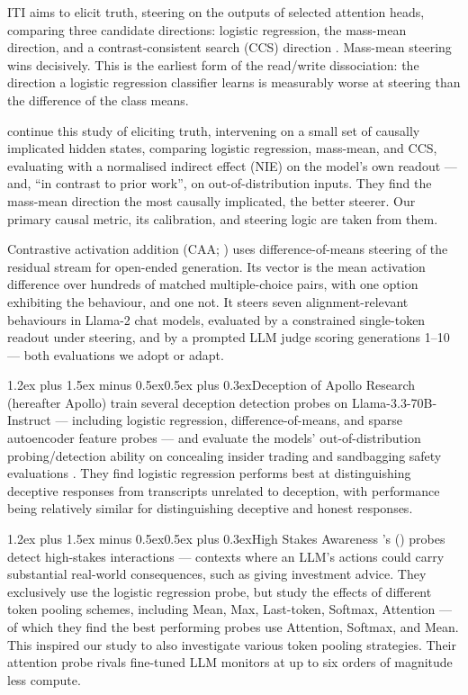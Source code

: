\documentclass[conference]{IEEEtran}
\makeatletter
\renewcommand{\paragraph}{\@startsection{paragraph}{4}{2em}%
  {1.2ex plus 1.5ex minus 0.5ex}{0.5ex plus 0.3ex}{\normalfont\normalsize\itshape}}
\makeatother
\begin{document}
ITI \citep{li2023} aims to elicit truth, steering on the outputs of selected attention heads, comparing three
candidate directions: logistic regression, the mass-mean direction, and a contrast-consistent search (CCS) direction \citep{burns2023}.
Mass-mean steering wins decisively. This is the earliest form of the read/write
dissociation: the direction a logistic regression classifier learns is measurably worse at steering
than the difference of the class means.

\citet[§6]{marks2024} continue this study of eliciting truth, intervening on a
small set of causally implicated hidden states, comparing logistic regression, mass-mean, and CCS, evaluating with a normalised indirect effect (NIE) on the model's own readout
--- and, ``in contrast to prior work'', on out-of-distribution inputs. They
find the mass-mean direction the most causally implicated, the better steerer. Our primary causal
metric, its calibration, and steering logic are taken from them.

Contrastive activation addition (CAA; \citealt{rimsky2024}) uses
difference-of-means steering of the residual stream for open-ended generation.
Its vector is the mean activation difference over hundreds of matched
multiple-choice pairs, with one option exhibiting the
behaviour, and one not. It steers seven alignment-relevant behaviours in
Llama-2 chat models, evaluated by a constrained single-token readout under steering, and by a prompted LLM judge
scoring generations 1--10 --- both evaluations we adopt or adapt.

\paragraph{Deception}
\citet{goldowsky2025} of Apollo Research (hereafter Apollo) train
several deception detection probes on
Llama-3.3-70B-Instruct --- including logistic regression, difference-of-means,
and sparse autoencoder feature probes --- and evaluate the models' out-of-distribution
probing/detection ability on concealing insider trading \citep{scheurer2023} and
sandbagging safety evaluations \citep{benton2024}. They find logistic
regression performs best at distinguishing deceptive responses from transcripts
unrelated to deception, with performance being relatively similar for
distinguishing deceptive and honest responses.

\paragraph{High Stakes Awareness}
\citeauthor{mckenzie2025}'s (\citeyear{mckenzie2025}) probes detect high-stakes interactions ---
contexts where an LLM's actions could carry substantial real-world
consequences, such as giving investment advice. They exclusively use the
logistic regression probe, but study the effects of different token pooling
schemes, including Mean, Max, Last-token, Softmax, Attention --- of which they
find the best performing probes use Attention, Softmax, and Mean. This inspired
our study to also investigate various token pooling strategies. Their attention
probe rivals fine-tuned LLM monitors at up to six orders of
magnitude less compute.
\end{document}
